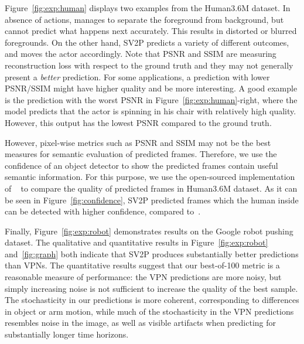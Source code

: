 \documentclass{article} \usepackage{iclr2018_conference,times}
\begin{document}
Figure~\ref{fig:exp:human} displays two examples from the Human3.6M dataset. In absence of actions, 
\cite{finn2016unsupervised} manages to separate the foreground from background, but cannot predict what happens next accurately. This results in distorted or blurred foregrounds. On the other hand, SV2P predicts a variety of different outcomes, and moves the actor accordingly. Note that PSNR and SSIM are measuring reconstruction loss with respect to the ground truth and they may not generally present a \textit{better} prediction. For some applications, a prediction with lower PSNR/SSIM might have higher quality and be more interesting. A good example is the prediction with the worst PSNR in Figure~\ref{fig:exp:human}-right, where the model predicts that the actor is spinning in his chair with relatively high quality. However, this output has the lowest PSNR compared to the ground truth. 

However, pixel-wise metrics such as PSNR and SSIM may not be the best measures for semantic evaluation of predicted frames. Therefore, we use the confidence of an object detector to show the predicted frames contain useful semantic information. For this purpose, we use the open-sourced implementation of ~\cite{huang2016speed} to compare the quality of predicted frames in Human3.6M dataset. As it can be seen in Figure~\ref{fig:confidence}, SV2P predicted frames which the human inside can be detected with higher confidence, compared to~\cite{finn2016unsupervised}. 


Finally, Figure~\ref{fig:exp:robot} demonstrates results on the Google robot pushing dataset.
The qualitative and quantitative results in Figure~\ref{fig:exp:robot} and~\ref{fig:graph} both indicate that SV2P produces substantially better predictions than VPNs. The quantitative results suggest that our best-of-100 metric is a reasonable measure of performance: the VPN predictions are more noisy, but simply increasing noise is not sufficient to increase the quality of the best sample. The stochasticity in our predictions is more coherent, corresponding to differences in object or arm motion, while much of the stochasticity in the VPN predictions resembles noise in the image, as well as visible artifacts when predicting for substantially longer time horizons.
\end{document}
